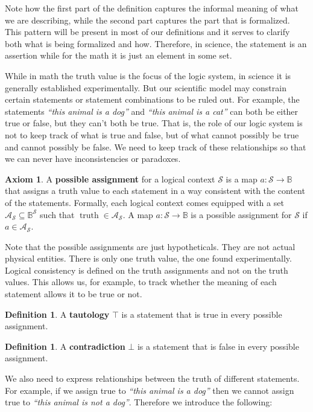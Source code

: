 \documentclass[%
reprint,
amsmath,amssymb,
aps,
prx,
]{revtex4-1}
\theoremstyle{plain}%
\theoremstyle{definition}
\newtheorem{defn}[thrm]{Definition}
\newtheorem{axiom}[thrm]{Axiom}
\theoremstyle{remark}
\DeclareMathOperator{\truth}{truth}
\def\Bool{\mathbb{B}}
\def\tautology{\top}
\def\contradiction{\bot}
\def\logCtx{\mathcal{S}}
\newcommand{\pAss}[1][\mathcal{S}] {\mathcal{A}_{#1}}
\newcommand{\statement}[1] {\emph{``#1''}}
\begin{document}
Note how the first part of the definition captures the informal meaning of what we are describing, while the second part captures the part that is formalized. This pattern will be present in most of our definitions and it serves to clarify both what is being formalized and how. Therefore, in science, the statement is an assertion while for the math it is just an element in some set.

While in math the truth value is the focus of the logic system, in science it is generally established experimentally. But our scientific model may constrain certain statements or statement combinations to be ruled out. For example, the statements \statement{this animal is a dog} and \statement{this animal is a cat} can both be either true or false, but they can't both be true. That is, the role of our logic system is not to keep track of what is true and false, but of what cannot possibly be true and cannot possibly be false. We need to keep track of these relationships so that we can never have inconsistencies or paradoxes.

\begin{axiom}\label{ax_possible_assignemetns}
	A \textbf{possible assignment} for a logical context $\logCtx$ is a map $a : \logCtx \to \Bool$ that assigns a truth value to each statement in a way consistent with the content of the statements. Formally, each logical context comes equipped with a set $\pAss \subseteq \Bool^{\logCtx}$ such that $\truth \in \pAss$. A map $a : \logCtx \to \Bool$ is a possible assignment for $\logCtx$ if $a \in \pAss$.
\end{axiom}

Note that the possible assignments are just hypotheticals. They are not actual physical entities. There is only one truth value, the one found experimentally. Logical consistency is defined on the truth assignments and not on the truth values. This allows us, for example, to track whether the meaning of each statement allows it to be true or not.

\begin{defn}
	A \textbf{tautology} $\tautology$ is a statement that is true in every possible assignment.
\end{defn}

\begin{defn}
	A \textbf{contradiction} $\contradiction$ is a statement that is false in every possible assignment.
\end{defn}

We also need to express relationships between the truth of different statements. For example, if we assign true to \statement{this animal is a dog} then we cannot assign true to \statement{this animal is not a dog}. Therefore we introduce the following:
\end{document}
